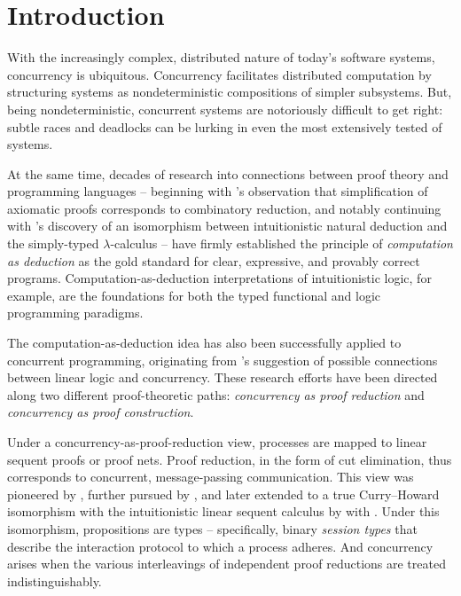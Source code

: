 \chapter{Introduction}\label{ch:introduction}

With the increasingly complex, distributed nature of today's software systems, concurrency is ubiquitous.
Concurrency facilitates distributed computation by structuring systems as nondeterministic compositions of simpler subsystems.
But, being nondeterministic, concurrent systems are notoriously difficult to get right: 
subtle races and deadlocks can be lurking in even the most extensively tested of systems.

At the same time, decades of research into connections between proof theory and programming languages -- beginning with \citeauthor{Curry:PNAS34}'s observation that simplification of axiomatic proofs corresponds to combinatory reduction\autocite{Curry:PNAS34}, and notably continuing with \citeauthor{Howard:69}'s discovery of an isomorphism between intuitionistic natural deduction and the simply-typed $\lambda$-calculus\autocite{Howard:69} -- have firmly established the principle of \emph{computation as deduction} as the gold standard for clear, expressive, and provably correct programs.
Computation-as-deduction interpretations of intuitionistic logic, for example, are the foundations for both the typed functional\autocite{Martin-Lof:LMPS82} and logic\autocites{Miller+:PAL91}{Andreoli:JLC92} programming paradigms.

The computation-as-deduction idea has also been successfully applied to concurrent programming, originating from \citeauthor{Girard:TCS87}'s suggestion of possible connections between linear logic and concurrency\autocite{Girard:TCS87}.
These research efforts have been directed along two different proof-theoretic paths: \emph{concurrency as proof reduction} and \emph{concurrency as proof construction}.


Under a concurrency-as-proof-reduction view, processes are mapped to linear sequent proofs or proof nets.
Proof reduction, in the form of cut elimination, thus corresponds to concurrent, message-passing communication.
This view was pioneered by , further pursued by , and later extended to a true Curry--Howard isomorphism with the intuitionistic linear sequent calculus by \citeauthor{Caires+Pfenning:CONCUR10} with \citeauthor{Toninho:CMU15}\autocites{Caires+Pfenning:CONCUR10}{Caires+:TLDI12}{Caires+:MSCS16}.
Under this isomorphism, propositions are types -- specifically, binary \emph{session types}\autocite{Honda:CONCUR93} that describe the interaction protocol to which a process adheres.
And concurrency arises when the various interleavings of independent proof reductions are treated indistinguishably.

